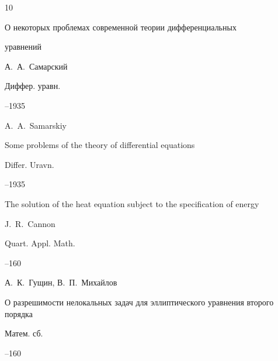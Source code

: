 \begin{thebibliography}{10}




\paper О некоторых проблемах современной теории дифференциальных

уравнений

\by А.~А.~Самарский

\jour Диффер. уравн.




--1935

\misctransl 

\by A.~A.~Samarskiy

\paper  Some problems of the theory of differential equations

\jour Differ. Uravn.




–1935






\paper The solution of the heat equation subject to the specification of energy

\by J.~R.~Cannon

\jour Quart. Appl. Math.



--160






\by А.~К.~Гущин, В.~П.~Михайлов

\paper О разрешимости нелокальных задач для эллиптического уравнения второго порядка

\jour Матем. сб.




--160





\end{thebibliography}
